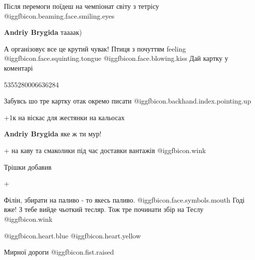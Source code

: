  
 
 
 
 
\zzSecCmt

\begin{itemize} %
Після перемоги поїдеш на чемпіонат світу з тетрісу  @igg{fbicon.beaming.face.smiling.eyes} 

\textbf{Andriy Brygida} таааак)


А організовує все це крутий чувак! Птиця з почуттям feeling  @igg{fbicon.face.squinting.tongue}  @igg{fbicon.face.blowing.kiss} 
Дай картку у коментарі

5355280006636284

Забувсь шо тре картку отак окремо писати  @igg{fbicon.backhand.index.pointing.up} 

+1к на віскас для жестянки на кальосах

\textbf{Andriy Brygida} яке ж ти мур!

+ на каву та смаколики під час доставки вантажів @igg{fbicon.wink} 

Трішки добавив

+

Філін, збирати на паливо - то якесь паливо. @igg{fbicon.face.symbols.mouth}  Годі вже!
З тебе вийде чьоткий тесляр.
Тож тре починати збір на Теслу @igg{fbicon.wink} 

 @igg{fbicon.heart.blue}  @igg{fbicon.heart.yellow} 

Мирної дороги  @igg{fbicon.fist.raised} 

\end{itemize} %

